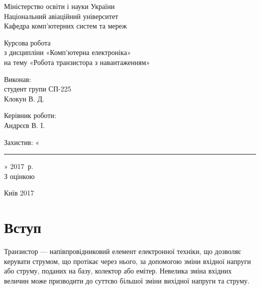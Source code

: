 \documentclass[14pt,ukrainian,utf8,simple]{eskdtext}
\let\stdsection\section
\renewcommand\section{\newpage\stdsection}
\begin{document}
	
	\begin{titlepage}
	\begin{center}
			Міністерство освіти і науки України\\
			Національний авіаційний університет\\
			Кафедра комп'ютерних систем та мереж

			\vspace{\fill}
			Курсова робота\\
			з дисципліни «Комп'ютерна електроніка»\\
			на тему «Робота транзистора з навантаженням»
			
			\vspace{\fill}
			
			\hspace{\fill}
			\begin{minipage}{0.5\textwidth}
			\raggedright
				Виконав:\\
				студент групи СП-225\\
				Клокун В. Д.
				
				\vspace{\baselineskip}
				
				Керівник роботи:\\
				Андрєєв В. I.
			
			\vspace{\baselineskip}
			
				Захистив: «\rule{2em}{0.4pt}» \hrulefill { }2017~р.\\
				З оцінкою \hrulefill
			\end{minipage}
			
			\vspace{2\baselineskip}
			
			Київ 2017
		\end{center}
	\end{titlepage}
	

	\newpage
	
	\setcounter{page}{2}
	
	\section*{Вступ}
		Транзистор --- напівпровідниковий елемент електронної техніки, що дозволяє керувати струмом, що протікає через нього, за допомогою зміни вхідної напруги або струму, поданих на базу, колектор або емітер. Невелика зміна вхідних величин може призводити до суттєво більшої зміни вихідної напруги та струму.
		
\end{document}
